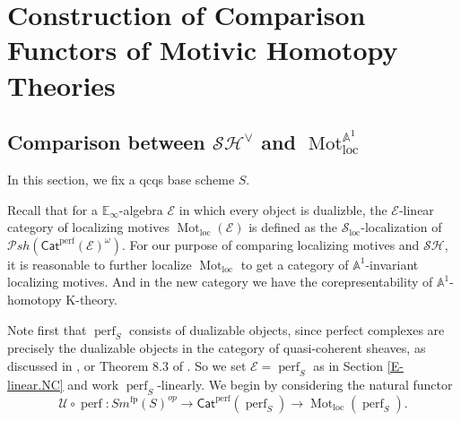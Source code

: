 \documentclass{article}
\theoremstyle{definition}
\newcommand{\on}{\operatorname}
\begin{document}
\section{Construction of Comparison Functors of Motivic Homotopy Theories}\label{section:pres}
\subsection{Comparison between $\mathcal{SH}^{\vee}$ and $\on{Mot}_{\on{loc}}^{\mathbb{A}^1}$}
In this section, we fix a qcqs base scheme $S$.


Recall that for a $\mathbb{E}_\infty$-algebra $\mathcal{E}$ in which every object is dualizble, the $\mathcal{E}$-linear category of localizing motives $\on{Mot}_{\on{loc}}(\mathcal{E})$ is defined as the $\mathcal{S}_{\on{loc}}$-localization of $\mathcal{P}sh(\mathsf{Cat}^{\on{perf}}(\mathcal{E})^\omega)$. For our purpose of comparing localizing motives and $\mathcal{SH}$, it is reasonable to further localize $\on{Mot}_{\on{loc}}$ to get a category of $\mathbb{A}^1$-invariant localizing motives. And in the new category we have the corepresentability of $\mathbb{A}^1$-homotopy K-theory.


Note first that $\on{perf}_S$ consists of dualizable objects, since perfect complexes are precisely the dualizable objects in the category of quasi-coherent sheaves, as discussed in \cite{TT}, or Theorem 8.3 of \cite{Sch}. So we set $\mathcal{E}=\on{perf}_S$ as in Section \ref{E-linear.NC} and work $\on{perf}_S$-linearly. We begin by considering the natural functor\[
\mathcal{U}\circ \on{perf} : Sm^{\on{fp}}(S)^{op}\rightarrow \mathsf{Cat}^{\on{perf}}(\on{perf}_S)\rightarrow\on{Mot}_{\on{loc}}(\on{perf}_S).\]
\end{document}
